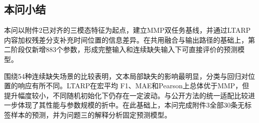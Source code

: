 
\subsection{本问小结}\label{subsec:q2_summary}
\QTwoParagraph 本问以附件2已对齐的三模态特征为起点，建立MMP双任务基线，并通过LTARP内容加权残差分支补充时间位置的信息差异。在共用融合与输出路径的基础上，第二阶段仅新增883个参数，形成完整输入和连续缺失输入下可直接评价的预测模型。

\QTwoParagraph 围绕54种连续缺失场景的比较表明，文本局部缺失的影响最明显，分类与回归对位置的响应有所不同。LTARP在宏平均 F1、MAE和Pearson上总体优于MMP，但提升幅度较小，不同随机初始化下仍存在一定波动。与公开方法的统一适配比较进一步体现了其性能与参数规模的折中。在此基础上，本问完成附件3全部30条无标签样本的预测，并为问题三的解释分析固定预测模型。
